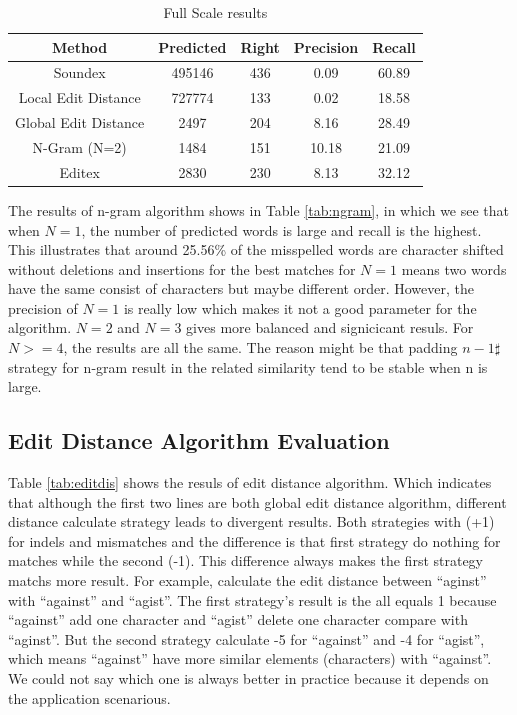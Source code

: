 \documentclass[11pt]{article}
\begin{document}
\begin{table}
	\centering
	\begin{tabular}{c|c|c|c|c}
		\hline
		Method &Predicted & Right & Precision & Recall \\
		\hline
		Soundex & 495146 & 436 & 0.09 & 60.89 \\
		\hline
		Local Edit Distance  & 727774 & 133 & 0.02 & 18.58 \\
		\hline
		Global Edit Distance  & 2497 & 204 & 8.16 & 28.49 \\
		\hline
		N-Gram (N=2) & 1484 & 151 & 10.18 & 21.09 \\
		\hline
		Editex & 2830 & 230 & 8.13 & 32.12 \\
		\hline
	\end{tabular}
	\caption{Full Scale results}
	\label{tab:result}
\end{table}

The results of n-gram algorithm shows in Table \ref{tab:ngram}, in which we see that when $N=1$, the number of predicted words is large and recall is the highest. This illustrates that around 25.56\% of the misspelled words are character shifted without deletions and insertions for the best matches for $N=1$ means two words have the same consist of characters but maybe different order. However, the precision of $N=1$ is really low which makes it not a good parameter for the algorithm. $N=2$ and $N=3$ gives more balanced and signicicant resuls. For $N>=4$, the results are all the same. The reason might be that padding $n-1 \sharp$ strategy for n-gram result in the related similarity tend to be stable when n is large. 

\subsection{Edit Distance Algorithm Evaluation}

Table \ref{tab:editdis} shows the resuls of edit distance algorithm. Which indicates that although the first two lines are both global edit distance algorithm, different distance calculate strategy leads to divergent results. Both strategies with (+1) for indels and mismatches and the difference is that first strategy do nothing for matches while the second (-1). This difference always makes the first strategy matchs more result. For example, calculate the edit distance between ``aginst'' with ``against'' and ``agist''. The first strategy's result is the all equals 1 because ``against'' add one character and ``agist'' delete one character compare with ``aginst''. But the second strategy calculate -5 for ``against'' and -4 for ``agist'', which means ``against'' have more similar elements (characters) with ``against''. We could not say which one is always better in practice because it depends on the application scenarious.
\end{document}
